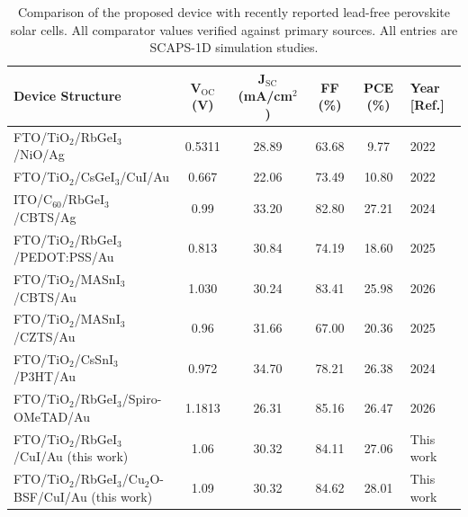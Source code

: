 \documentclass[12pt]{article}
\begin{document}
\begin{table}[htbp]
\centering
{\scriptsize\setlength{\tabcolsep}{2pt}
\begin{tabularx}{\textwidth}{XccccX}
\hline
Device Structure & V$_{\mathrm{OC}}$ (V) & J$_{\mathrm{SC}}$ (mA/cm$^{2}$) & FF (\%) & PCE (\%) & Year [Ref.]
\\\hline
FTO/\allowbreak{}TiO$_{2}$/RbGeI$_{3}$/NiO/\allowbreak{}Ag & 0.5311 & 28.89 & 63.68 & 9.77 & 2022 \cite{r14}\\
FTO/\allowbreak{}TiO$_{2}$/CsGeI$_{3}$/CuI/\allowbreak{}Au & 0.667 & 22.06 & 73.49 & 10.80 & 2022 \cite{r24}\\
ITO/\allowbreak{}C$_{60}$/RbGeI$_{3}$/CBTS/\allowbreak{}Ag & 0.99 & 33.20 & 82.80 & 27.21 & 2024 \cite{r22}\\
FTO/\allowbreak{}TiO$_{2}$/RbGeI$_{3}$/PEDOT:PSS/\allowbreak{}Au & 0.813 & 30.84 & 74.19 & 18.60 & 2025 \cite{r39}\\
FTO/\allowbreak{}TiO$_{2}$/MASnI$_{3}$/CBTS/\allowbreak{}Au & 1.030 & 30.24 & 83.41 & 25.98 & 2026 \cite{r41}\\
FTO/\allowbreak{}TiO$_{2}$/MASnI$_{3}$/CZTS/Au & 0.96 & 31.66 & 67.00 & 20.36 & 2025 \cite{r42}\\
FTO/\allowbreak{}TiO$_{2}$/CsSnI$_{3}$/P3HT/Au & 0.972 & 34.70 & 78.21 & 26.38 & 2024 \cite{r40}\\
FTO/\allowbreak{}TiO$_{2}$/RbGeI$_{3}$/Spiro-OMeTAD/\allowbreak{}Au & 1.1813 & 26.31 & 85.16 & 26.47 & 2026 \cite{r23}\\
FTO/\allowbreak{}TiO$_{2}$/RbGeI$_{3}$/CuI/\allowbreak{}Au (this work) & 1.06 & 30.32 & 84.11 & 27.06 & This work\\
FTO/\allowbreak{}TiO$_{2}$/RbGeI$_{3}$/Cu$_{2}$O-BSF/CuI/\allowbreak{}Au (this work) & 1.09 & 30.32 & 84.62 & 28.01 & This work\\
\hline
\end{tabularx}
}
\caption{Comparison of the proposed device with recently reported lead-free perovskite solar cells. All comparator values verified against primary sources. All entries are SCAPS-1D simulation studies.}
\end{table}
\end{document}
